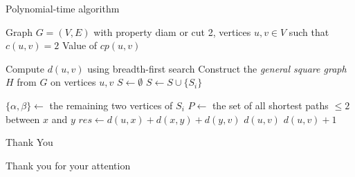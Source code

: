 \documentclass [xcolor=svgnames, t] {beamer}
\begin{document}
\begin{frame}{Polynomial-time algorithm}
\vspace{-1em}
    \begin{algorithm}[H]
    \tiny
\caption{Polynomial-time algorithm for computing \(cp(u,v)\) in a graph with the \textbf{diam or cut 2} property and \(c(u,v) = 2\)}
\begin{algorithmic}[1]
\Require Graph \(G=(V,E)\) with property diam or cut 2, vertices \(u,v \in V\) such that \(c(u,v)=2\)
\Ensure Value of \(cp(u,v)\)

\State Compute \(d(u,v)\) using breadth-first search
\State Construct the \textit{general square graph} \(H\) from \(G\) on vertices \(u,v\)
\State \(S \gets \emptyset\)
    \State \(S \gets S \cup \{S_i\}\)
\EndFor

        \State \(\{\alpha, \beta\} \gets\) the remaining two vertices of \(S_i\)
        \State \(P \gets\) the set of all shortest paths \(\leq2\) between \(x\) and \(y\)
                \State \(res \gets d(u,x) + d(x,y) + d(y,v)\)
                    \State \Return \(d(u,v)\)
                \EndIf
            \EndIf
        \EndFor
    \EndFor
\EndFor
\State \Return \(d(u,v) + 1\)
\end{algorithmic}
\end{algorithm}
\end{frame}












\begin{frame}{Thank You}
\vspace{1.5em}
\begin{center}
    \Large Thank you for your attention
\end{center}
\end{frame}
\end{document}

